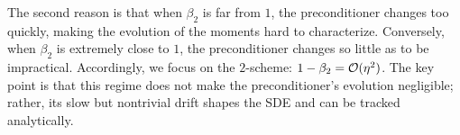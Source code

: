
The second reason is that when $\beta_2$ is far from $1$, the preconditioner changes too quickly, making the evolution of the moments hard to characterize. Conversely, when $\beta_2$ is extremely close to $1$, the preconditioner changes so little as to be impractical. Accordingly, we focus on the $2$-scheme: $1-\beta_2=\mathcal{O}(\eta^2)$. The key point is that this regime does not make the preconditioner’s evolution negligible; rather, its slow but nontrivial drift shapes the SDE and can be tracked analytically.


